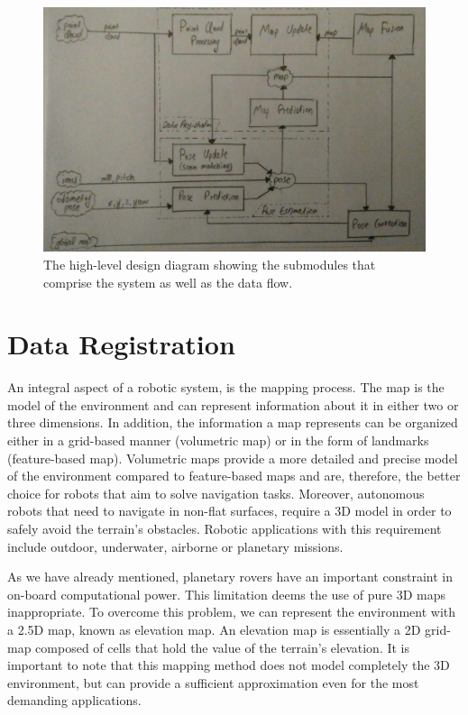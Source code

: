 \begin{figure}[th]
    \centering
    \includegraphics[scale=0.4]{Figures/high_level_design_diagram}
    \decoRule
    \caption[High Level Design Diagram]{
        The high-level design diagram showing the submodules that comprise
        the system as well as the data flow.}
    \label{fig:HLD}
\end{figure}

\section{Data Registration}

An integral aspect of a robotic system, is the mapping process.
The map is the model of the environment and can represent information about
it in either two or three dimensions. In addition, the information a map
represents can be organized either in a grid-based manner (volumetric
map) or in the form of landmarks (feature-based map). Volumetric maps provide
a more detailed and precise model of the environment compared to feature-based
maps and are, therefore, the better choice for robots that aim to solve
navigation tasks. Moreover, autonomous robots that need to navigate in
non-flat surfaces, require a 3D model in order to safely avoid the terrain's
obstacles. Robotic applications with this requirement include outdoor,
underwater, airborne or planetary missions.


As we have already mentioned, planetary rovers have an important constraint
in on-board computational power. This limitation deems the use of pure 3D
maps inappropriate. To overcome this problem, we can represent the
environment with a 2.5D map, known as elevation map. An elevation map
is essentially a 2D grid-map composed of cells that hold the value of
the terrain's elevation. It is important to note that this mapping method
does not model completely the 3D environment, but can provide a
sufficient approximation even for the most demanding applications.

